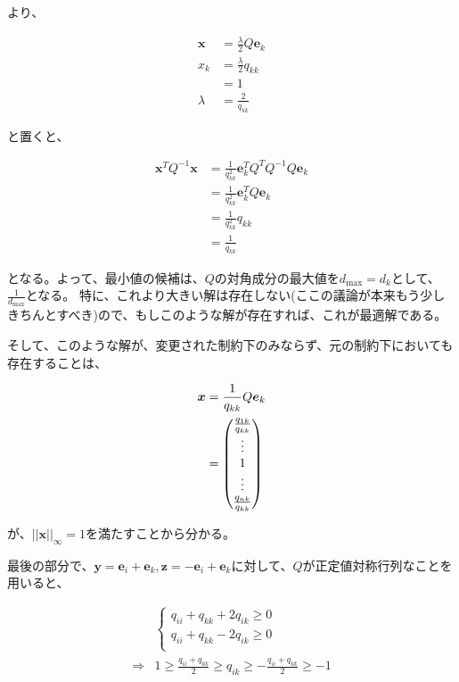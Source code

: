\documentclass[a4paper, 10pt, dvipdfmx]{jlreq}
\begin{document}
より、

\begin{align*}
  \bm{x}  & =\frac{\lambda}{2}Q\bm{e}_k \\
  x_k     & =\frac{\lambda}{2}q_{kk}    \\
          & =1                          \\
  \lambda & =\frac{2}{q_{kk}}
\end{align*}

と置くと、

\begin{align*}
  \bm{x}^TQ^{-1}\bm{x} & =\frac{1}{q_{kk}^2}\bm{e}_k^TQ^TQ^{-1}Q\bm{e}_k \\
                       & =\frac{1}{q_{kk}^2}\bm{e}_k^TQ\bm{e}_k          \\
                       & =\frac{1}{q_{kk}^2}q_{kk}                       \\
                       & =\frac{1}{q_{kk}}
\end{align*}

となる。よって、最小値の候補は、$Q$の対角成分の最大値を$d_{\text{max}}=d_k$として、$\frac{1}{d_{\text{max}}}$となる。
特に、これより大きい解は存在しない(ここの議論が本来もう少しきちんとすべき)ので、もしこのような解が存在すれば、これが最適解である。

そして、このような解が、変更された制約下のみならず、元の制約下においても存在することは、

\begin{align*}
  \bm{x} & =\frac{1}{q_{kk}}Q\bm{e}_k   \\
         & =\mqty(\frac{q_{1k}}{q_{kk}} \\ \vdots \\ 1 \\ \vdots \\ \frac{q_{nk}}{q_{kk}})\\
\end{align*}

が、$||\bm{x}||_\infty=1$を満たすことから分かる。

最後の部分で、$\bm{y}=\bm{e}_i+\bm{e}_k,\bm{z}=-\bm{e}_i+\bm{e}_k$に対して、$Q$が正定値対称行列なことを用いると、

\begin{align*}
              & \begin{cases}
    q_{ii}+q_{kk}+2q_{ik} \geq 0 \\
    q_{ii}+q_{kk}-2q_{ik} \geq 0 \\
  \end{cases}                                                         \\
  \Rightarrow & 1 \geq \frac{q_{ii}+q_{kk}}{2} \geq  q_{ik} \geq -\frac{q_{ii}+q_{kk}}{2} \geq -1
\end{align*}
\end{document}
